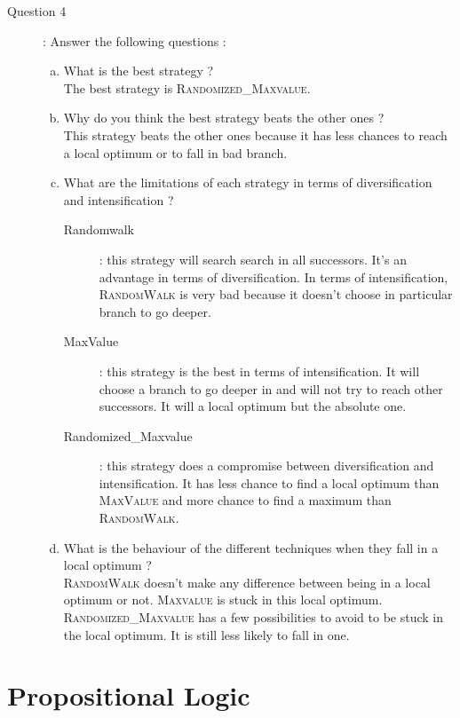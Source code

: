 \begin{description}


\item[Question 4]: Answer the following questions :
\begin{enumerate}[(a)]
\item What is the best strategy ?\\
The best strategy is \textsc{Randomized\_Maxvalue}.
\item Why do you think the best strategy beats the other ones ?\\
This strategy beats the other ones because it has less chances to reach a local optimum or to fall in bad branch.
\item What are the limitations of each strategy in terms of diversification and intensification ?\\
\begin{description}
\item[Randomwalk]: this strategy will search search in all successors. It's an advantage in terms of diversification. In terms of intensification, \textsc{RandomWalk} is very bad because it doesn't choose in particular branch to go deeper. 
\item[MaxValue]: this strategy is the best in terms of intensification. It will choose a branch to go deeper in and will not try to reach other  successors. It will a local optimum but the absolute one. 
\item[Randomized\_Maxvalue]: this strategy does a compromise between diversification and intensification. It has less chance to find a local optimum than \textsc{MaxValue} and more chance to find a maximum than \textsc{RandomWalk}.
\end{description}

\item What is the behaviour of the different techniques when they fall in a local optimum ?\\
\textsc{RandomWalk} doesn't make any difference between being in a local optimum or not. \textsc{Maxvalue} is stuck in this local optimum. \textsc{Randomized\_Maxvalue} has a few possibilities to avoid to be stuck in the local optimum. It is still less likely to fall in one.

\end{enumerate}
\end{description}

\section{Propositional Logic}
